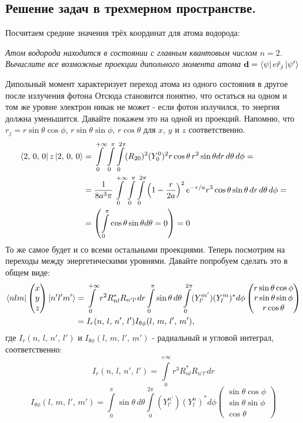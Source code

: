 \subsection{Решение задач в трехмерном пространстве.}
Посчитаем средние значения трёх координат для атома водорода:
\begin{center}
    \textit{Атом водорода находится в состоянии с главным квантовым числом $n = 2$. Вычислите все возможные проекции дипольного момента атома $\mathbf{d} = \bra{\psi}e\hat{r}_j\ket{\psi'}$}
\end{center}
Дипольный момент характеризует переход атома из одного состояния в другое после излучения фотона Отсюда становится понятно, что остаться на одном и том же уровне электрон никак не может - если фотон излучился, то энергия должна уменьшится. Давайте покажем это на одной из проекций. Напомню, что $r_j = r\sin\theta\cos\phi$, $r\sin\theta\sin\phi$, $r\cos\theta$ для $x$, $y$ и $z$ соответственно.
\begin{align*}
    \bra{2,\, 0,\, 0}z\ket{2,\, 0,\, 0} &= \int\limits_{0}^{+\infty}\int\limits_{0}^{\pi}\int\limits_{0}^{2\pi}(R_{20})^2(Y^0_0)^2r\cos\theta \, r^2\sin\theta dr\, d\theta\, d\phi =\\& = \frac{1}{8a^3\pi} \int\limits_{0}^{+\infty}\int\limits_{0}^{\pi}\int\limits_{0}^{2\pi} \left( 1 - \frac{r}{2a} \right)^2 e^{-r/a} r^3\cos\theta\sin\theta\, dr \, d\theta\, d\phi = \\ & = \left(\int\limits_{0}^{\pi} \cos\theta \sin\theta d\theta = 0\right) = 0
\end{align*}
То же самое будет и со всеми остальными проекциями. Теперь посмотрим на переходы между энергетическими уровнями. Давайте попробуем сделать это в общем виде:
\begin{align*}
    \bra{nlm}\begin{pmatrix} x \\ y \\ z \end{pmatrix}\ket{n'l'm'} &= \int\limits_{0}^{+\infty} r^2 R^*_{nl} R_{n'l'} dr \int\limits_{0}^{\pi}\sin\theta\,d\theta\int\limits_{0}^{2\pi}(Y^{m'}_{l'}) (Y^m_l)^*d\phi \begin{pmatrix} r\sin\theta\cos\phi \\ r\sin\theta\sin\phi \\ r\cos\theta \end{pmatrix}\\ & = I_r(n,\,l,\,n',\,l')I_{\theta\phi}(l,\,m,\,l',\,m'),
\end{align*}
где $I_r(n,\,l,\,n',\,l')$ и $I_{\theta\phi}(l,\,m,\,l',\,m')$ - радиальный и угловой интеграл, соответственно:
\[
I_r(n,\,l,\,n',\,l') = \int\limits_{0}^{+\infty} r^3 R^*_{nl} R_{n'l'} dr
\]
\[
I_{\theta\phi}(l,\,m,\,l',\,m') = \int\limits_{0}^{\pi}\sin\theta\,d\theta\int\limits_{0}^{2\pi}(Y^{n'}_{l'}) (Y^n_l)^*d\phi \begin{pmatrix} \sin\theta\cos\phi \\ \sin\theta\sin\phi \\ \cos\theta \end{pmatrix}
\]

